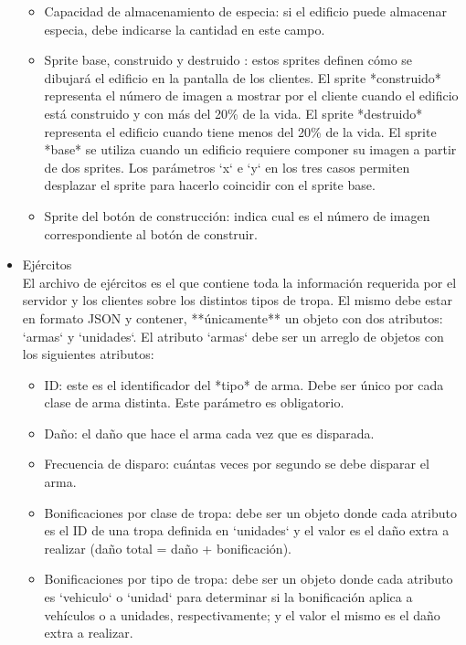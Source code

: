 \documentclass[titlepage,a4paper,12pt]{article}
\begin{document}
\begin{itemize}
\begin{itemize}
\item Capacidad de almacenamiento de especia: si el edificio puede almacenar especia, debe indicarse la cantidad en este campo.

\item Sprite base, construido y destruido : estos sprites definen cómo se dibujará el edificio en la pantalla de los clientes. El sprite *construido* representa el número de imagen a mostrar por el cliente cuando el edificio está construido y con más del 20\% de la vida. El sprite *destruido* representa el edificio cuando tiene menos del 20\% de la vida. El sprite *base* se utiliza cuando un edificio requiere componer su imagen a partir de dos sprites. Los parámetros `x` e `y` en los tres casos permiten desplazar el sprite para hacerlo coincidir con el sprite base.

\item Sprite del botón de construcción: indica cual es el número de imagen correspondiente al botón de construir.

\end{itemize}

\item Ejércitos\\

El archivo de ejércitos es el que contiene toda la información requerida por el servidor y los clientes sobre los distintos tipos de tropa. El mismo debe estar en formato JSON y contener, **únicamente** un objeto con 
dos atributos: `armas` y `unidades`.  El atributo `armas` debe ser un arreglo de objetos con los siguientes atributos:


\begin{itemize}

\item ID: este es el identificador del *tipo* de arma. Debe ser único por cada clase de arma distinta. Este parámetro es obligatorio.

\item Daño: el daño que hace el arma cada vez que es disparada.


\item Frecuencia de disparo: cuántas veces por segundo se debe disparar el arma.

\item Bonificaciones por clase de tropa: debe ser un objeto donde cada atributo es el ID de una tropa definida en `unidades` y el valor es el daño extra a realizar (daño total = daño + bonificación).

\item Bonificaciones por tipo de tropa: debe ser un objeto donde cada atributo es `vehiculo` o `unidad` para determinar si la bonificación aplica a vehículos o a unidades, respectivamente; y el valor el mismo es el daño extra a realizar.


\end{itemize}
\end{itemize}
\end{document}
